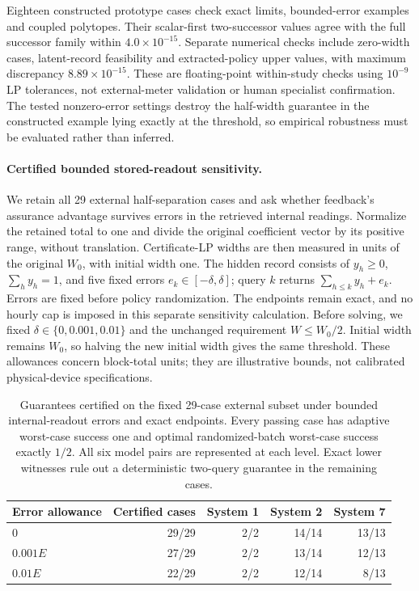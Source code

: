 Eighteen constructed prototype cases check exact limits, bounded-error
examples and coupled polytopes. Their scalar-first two-successor values
agree with the full successor family within $4.0\times10^{-15}$.
Separate numerical checks include zero-width cases, latent-record feasibility
and extracted-policy upper values, with maximum discrepancy
$8.89\times10^{-15}$. These are floating-point within-study checks using
$10^{-9}$ LP tolerances, not external-meter validation or human specialist
confirmation. The tested nonzero-error settings destroy the half-width guarantee in the
constructed example lying exactly at the threshold, so empirical
robustness must be evaluated rather than inferred.

\paragraph{Certified bounded stored-readout sensitivity.}\label{sec:stored-error-sensitivity}
We retain all 29 external half-separation cases and ask whether feedback's
assurance advantage survives errors in the retrieved internal readings.
Normalize the retained total to one and divide the original coefficient
vector by its positive range, without translation. Certificate-LP widths
are then measured in units of the original $W_0$, with initial width one.
The hidden record consists of
$y_h\geq0$, $\sum_h y_h=1$, and five fixed errors
$e_k\in[-\delta,\delta]$; query $k$ returns
$\sum_{h\leq k}y_h+e_k$. Errors are fixed before policy randomization.
The endpoints remain exact, and no hourly cap is imposed in this separate
sensitivity calculation. Before solving, we fixed
$\delta\in\{0,0.001,0.01\}$ and the unchanged requirement $W\leq W_0/2$.
Initial width remains $W_0$, so halving the new initial width gives the
same threshold. These allowances concern block-total units; they are
illustrative bounds, not calibrated physical-device specifications.

\begin{table}[htbp]\centering\small
\caption{Guarantees certified on the fixed 29-case external subset under
bounded internal-readout errors and exact endpoints. Every passing case
has adaptive worst-case success one and optimal randomized-batch worst-case
success exactly $1/2$. All six model pairs are represented at each level.
Exact lower witnesses rule out a deterministic two-query guarantee in the
remaining cases.}
\label{tab:stored-error-certificates}
\begin{tabular}{lrrrr}\toprule
Error allowance & Certified cases & System 1 & System 2 & System 7\\\midrule
$0$ & 29/29 & 2/2 & 14/14 & 13/13\\
$0.001E$ & 27/29 & 2/2 & 13/14 & 12/13\\
$0.01E$ & 22/29 & 2/2 & 12/14 & 8/13\\\bottomrule
\end{tabular}\end{table}

